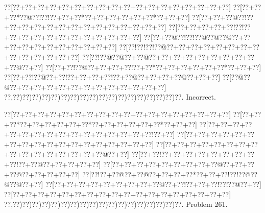 \documentclass[a5paper]{article}
\begin{document}
\begin{center}
{\goo
\0??[\0??+\0??+\0??+\0??+\0??+\0??+\0??+\0??+\0??+\0??+\0??+\0??+\0??+\0??+\0??+\0??+\0??+\0??]
\0??[\0??+\0??+\0??*\0??@\0??!\0??!\0??+\0??+\0??*\0??+\0??+\0??+\0??+\0??+\0??*\0??+\0??+\0??]
\0??[\0??+\0??+\0??@\0??!\0??+\0??+\0??+\0??+\0??+\0??+\0??+\0??+\0??+\0??+\0??+\0??+\0??+\0??]
\0??[\0??+\0??+\0??+\0??+\0??!\0??!\0??+\0??+\0??+\0??+\0??+\0??+\0??+\0??+\0??+\0??+\0??+\0??]
\0??[\0??+\0??@\0??!\0??!\0??@\0??@\0??@\0??+\0??+\0??+\0??+\0??+\0??+\0??+\0??+\0??+\0??+\0??]
\0??[\0??!\0??!\0??!\0??@\0??+\0??+\0??+\0??+\0??+\0??+\0??+\0??+\0??+\0??+\0??+\0??+\0??+\0??]
\0??[\0??!\0??@\0??@\0??+\0??@\0??+\0??+\0??+\0??+\0??+\0??+\0??+\0??+\0??+\0??@\0??+\0??]
\0??[\0??+\0??!\0??@\0??+\0??+\0??+\0??!\0??+\0??*\0??+\0??+\0??+\0??+\0??+\0??*\0??+\0??+\0??]
\0??[\0??+\0??!\0??@\0??+\0??!\0??+\0??+\0??+\0??!\0??+\0??@\0??+\0??+\0??+\0??@\0??+\0??+\0??]
\0??[\0??@\0??@\0??+\0??+\0??+\0??+\0??+\0??+\0??+\0??+\0??+\0??+\0??+\0??+\0??]
\0??,\0??)\0??)\0??)\0??)\0??)\0??)\0??)\0??)\0??)\0??)\0??)\0??)\0??)\0??)\0??)\0??)\0??)\0??.
}
Incorrect. 

\end{center}
\newpage
\begin{center}
{\goo
\0??[\0??+\0??+\0??+\0??+\0??+\0??+\0??+\0??+\0??+\0??+\0??+\0??+\0??+\0??+\0??+\0??+\0??+\0??]
\0??[\0??+\0??+\0??*\0??+\0??+\0??+\0??+\0??+\0??*\0??+\0??+\0??+\0??+\0??+\0??*\0??+\0??+\0??]
\0??[\0??+\0??+\0??+\0??+\0??+\0??+\0??+\0??+\0??+\0??+\0??+\0??+\0??+\0??+\0??+\0??!\0??+\0??]
\0??[\0??+\0??+\0??+\0??+\0??+\0??+\0??+\0??+\0??+\0??+\0??+\0??+\0??+\0??+\0??+\0??+\0??+\0??]
\0??[\0??+\0??+\0??+\0??+\0??+\0??+\0??+\0??+\0??+\0??+\0??+\0??+\0??+\0??+\0??+\0??@\0??+\0??]
\0??[\0??+\0??!\0??+\0??+\0??+\0??+\0??+\0??+\0??+\0??+\0??!\0??+\0??@\0??+\0??+\0??+\0??+\0??]
\0??[\0??+\0??+\0??+\0??+\0??+\0??+\0??+\0??+\0??@\0??+\0??+\0??+\0??@\0??+\0??+\0??+\0??+\0??]
\0??[\0??!\0??+\0??@\0??+\0??@\0??+\0??+\0??+\0??*\0??+\0??+\0??!\0??!\0??@\0??@\0??@\0??+\0??]
\0??[\0??+\0??+\0??+\0??+\0??+\0??+\0??+\0??+\0??@\0??+\0??!\0??+\0??+\0??!\0??!\0??@\0??+\0??]
\0??[\0??+\0??+\0??+\0??+\0??+\0??+\0??+\0??+\0??+\0??+\0??+\0??+\0??+\0??+\0??+\0??+\0??+\0??]
\0??,\0??)\0??)\0??)\0??)\0??)\0??)\0??)\0??)\0??)\0??)\0??)\0??)\0??)\0??)\0??)\0??)\0??)\0??.
}
Problem 261.

\end{center}
\end{document}
